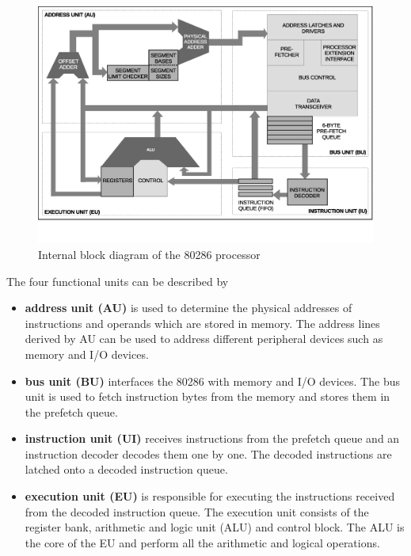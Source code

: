 \documentclass[book.tex]{subfiles}
\begin{document}
\begin{figure}[H]
\centering
\includegraphics[width=\textwidth]{imgs/drawings/286_architecture.eps}
\caption{Internal block diagram of the 80286 processor}
\end{figure}
\par
The four functional units can be described by
\begin{itemize}
\item \textbf{address unit (AU)} is used to determine the physical addresses of instructions and operands which are stored in memory. The address lines derived by AU can be used to address different peripheral devices such as memory and I/O devices. 
\item \textbf{bus unit (BU)} interfaces the 80286 with memory and I/O devices. The bus unit is used to fetch instruction bytes from the memory and stores them in the prefetch queue.
\item \textbf{instruction unit (UI)} receives instructions from the prefetch queue and an instruction decoder decodes them one by one. The decoded instructions are latched onto a decoded instruction queue.
\item \textbf{execution unit (EU)} is responsible for executing the instructions received from the decoded instruction queue. The execution unit consists of the register bank, arithmetic and logic unit (ALU) and control block. The ALU is the core of the EU and perform all the arithmetic and logical operations.
\end{itemize}
\par
\end{document}
